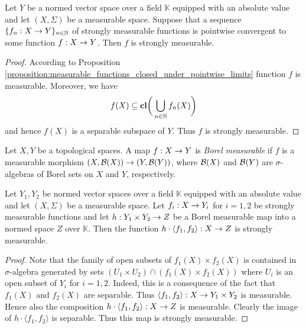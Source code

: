 \begin{proposition}\label{proposition:strongly_measurable_functions_closed_under_pointwise_limits}
Let $Y$ be a normed vector space over a field $\mathbb{K}$ equipped with an absolute value and let $(X,\Sigma)$ be a measurable space. Suppose that a sequence $\{f_n:X\rightarrow Y\}_{n\in {\mathbb N}}$ of strongly measurable functions is pointwise convergent to some function $f:X\rightarrow Y$. Then $f$ is strongly measurable.
\end{proposition}
\begin{proof}
According to Proposition \ref{proposition:measurable_functions_closed_under_pointwise_limits} function $f$ is measurable. Moreover, we have
$$f(X) \subseteq \mathbf{cl}\bigg(\bigcup_{n\in {\mathbb N}}f_n(X)\bigg)$$
and hence $f(X)$ is a separable subspace of $Y$. Thus $f$ is strongly measurable.
\end{proof}

\begin{definition}
Let $X, Y$ be a topological spaces. A map $f:X\rightarrow Y$ is \textit{Borel measurable} if $f$ is a measurable morphism $(X,{\mathcal B}(X))\rightarrow (Y,{\mathcal B}(Y))$, where ${\mathcal B}(X)$ and ${\mathcal B}(Y)$ are $\sigma$-algebras of Borel sets on $X$ and $Y$, respectively.
\end{definition}

\begin{proposition}\label{proposition:strongly_measurable_closed_under_Borel_operations}
Let $Y_1, Y_2$ be normed vector spaces over a field $\mathbb{K}$ equipped with an absolute value and let $(X,\Sigma)$ be a measurable space. Let $f_i:X\rightarrow Y_i$ for $i=1,2$ be strongly measurable functions and let $h:Y_1\times Y_2\rightarrow Z$ be a Borel measurable map into a normed space $Z$ over $\mathbb{K}$. Then the function $h\cdot \langle f_1,f_2\rangle:X\rightarrow Z$ is strongly measurable.
\end{proposition}
\begin{proof}
Note that the family of open subsets of $f_1(X)\times f_2(X)$ is contained in $\sigma$-algebra generated by sets $\left(U_1\times U_2\right)\cap \left(f_1(X)\times f_2(X)\right)$ where $U_i$ is an open subset of $Y_i$ for $i=1,2$. Indeed, this is a consequence of the fact that $f_1(X)$ and $f_2(X)$ are separable. Thus $\langle f_1, f_2\rangle:X\rightarrow Y_1\times Y_2$ is measurable. Hence also the composition $h\cdot \langle f_1,f_2\rangle:X\rightarrow Z$ is measurable. Clearly the image of $h\cdot \langle f_1,f_2\rangle$ is separable. Thus this map is strongly measurable.
\end{proof}

